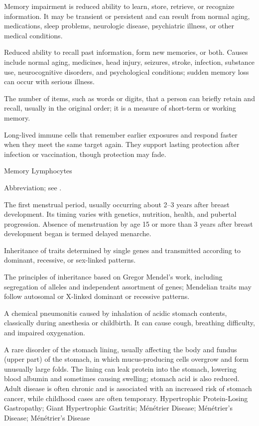  Memory impairment is reduced ability to learn, store, retrieve, or recognize information. It may be transient or persistent and can result from normal aging, medications, sleep problems, neurologic disease, psychiatric illness, or other medical conditions.

 Reduced ability to recall past information, form new memories, or both. Causes include normal aging, medicines, head injury, seizures, stroke, infection, substance use, neurocognitive disorders, and psychological conditions; sudden memory loss can occur with serious illness.

 The number of items, such as words or digits, that a person can briefly retain and recall, usually in the original order; it is a measure of short-term or working memory.

 Long-lived immune cells that remember earlier exposures and respond faster when they meet the same target again. They support lasting protection after infection or vaccination, though protection may fade.

\synonyms
Memory Lymphocytes

 Abbreviation; see .

 The first menstrual period, usually occurring about 2--3 years after
breast development. Its timing varies with genetics, nutrition, health, and pubertal
progression. Absence of menstruation by age 15 or more than 3 years after breast
development began is termed delayed menarche.

 Inheritance of traits determined by single genes and transmitted according to dominant, recessive, or sex-linked patterns.

 The principles of inheritance based on Gregor Mendel's work, including segregation of alleles and independent assortment of genes; Mendelian traits may follow autosomal or X-linked dominant or recessive patterns.

 A chemical pneumonitis caused by inhalation of acidic stomach contents, classically during anesthesia
or childbirth. It can cause cough, breathing difficulty, and impaired oxygenation.

 A rare disorder of the stomach lining, usually affecting the body and fundus (upper part) of the stomach, in which mucus-producing cells overgrow and form unusually large folds. The lining can leak protein into the stomach, lowering blood albumin and sometimes causing swelling; stomach acid is also reduced. Adult disease is often chronic and is associated with an increased risk of stomach cancer, while childhood cases are often temporary.
\synonyms
Hypertrophic Protein-Losing Gastropathy; Giant Hypertrophic Gastritis; Ménétrier Disease; Ménétrier's Disease; Ménétrier’s Disease

